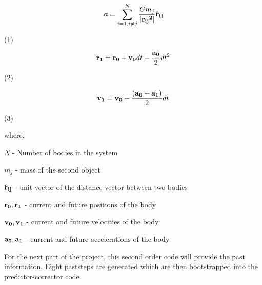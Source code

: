 \documentclass{article}
\begin{document}
\[  \textit{\textbf {a}} = \sum_{i=1, i \neq j}^{N}  \frac{Gm_j} {\left| \bf {r_{ij}}^2 \right|}  \bf{\hat {r}_{ij}} \]  \begin{flushright} (1)  \end{flushright}

\[ {\bf r_1} = {\bf r_0} + {\bf v_0} dt + \frac{{\bf a_0}} {2} dt^2 \]
\begin{flushright} (2)  \end{flushright}

\[ {\bf v_1} = {\bf v_0} + \frac{({\bf a_0}+{\bf a_1})} {2} dt \]
\begin{flushright} (3)  \end{flushright}

\smallskip

where, 

\smallskip

$N$ - Number of bodies in the system 

$m_j$ - mass of the second object

${\bf {\hat {r}_{ij}}}$  - unit vector of the distance vector between two bodies

${\bf r_0, r_1}$ - current and future positions of the body

${\bf v_0, v_1}$ - current and future velocities of the body

${\bf a_0, a_1}$ - current and future accelerations of the body

\bigskip                         
{\normalsize{
For the next part of the project, this second order code will provide the past information. Eight paststeps are generated which are then bootstrapped into the predictor-corrector code. }}

\bigskip
\end{document}
